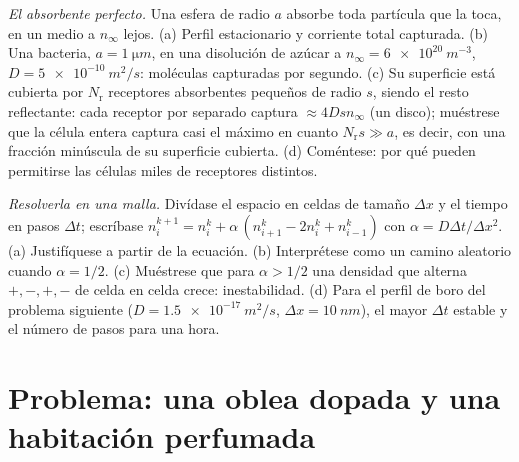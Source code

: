 \begin{exercise}[$\star\star\star$]\label{exo:b2:particle-diffusion:11}
\emph{El absorbente perfecto.} Una esfera de radio $a$ absorbe toda
partícula que la toca, en un medio a $n_\infty$ lejos. (a)
Perfil estacionario y corriente total capturada. (b) Una bacteria, $a =
\qty{1}{\micro m}$, en una disolución de azúcar a $n_\infty = \qty{6e20}{m^{-3}}$,
$D = \qty{5e-10}{m^2/s}$: moléculas capturadas por segundo. (c) Su
superficie está cubierta por $N_{\text{r}}$ receptores absorbentes pequeños de
radio $s$, siendo el resto reflectante: cada receptor por separado captura $\approx
4Ds n_\infty$ (un disco); muéstrese que la célula entera captura casi el
máximo en cuanto $N_{\text{r}} s \gg a$, es decir, con una fracción minúscula de su
superficie cubierta. (d) Coméntese: por qué pueden permitirse las células miles de
receptores distintos.
\end{exercise}

\begin{exercise}[$\star\star\star$]\label{exo:b2:particle-diffusion:12}
\emph{Resolverla en una malla.} Divídase el espacio en celdas de tamaño $\Delta x$
y el tiempo en pasos $\Delta t$; escríbase $n_i^{k+1} = n_i^k + \alpha\,(n_{i+1}^k
- 2n_i^k + n_{i-1}^k)$ con $\alpha = D\Delta t/\Delta x^2$. (a) Justifíquese
a partir de la ecuación. (b) Interprétese como un camino aleatorio cuando $\alpha =
1/2$. (c) Muéstrese que para $\alpha > 1/2$ una densidad que alterna $+,-,+,-$
de celda en celda crece: inestabilidad. (d) Para el perfil de boro del
problema siguiente ($D = \qty{1.5e-17}{m^2/s}$, $\Delta x = \qty{10}{nm}$),
el mayor $\Delta t$ estable y el número de pasos para una hora.
\end{exercise}

\section{Problema: una oblea dopada y una habitación perfumada}

